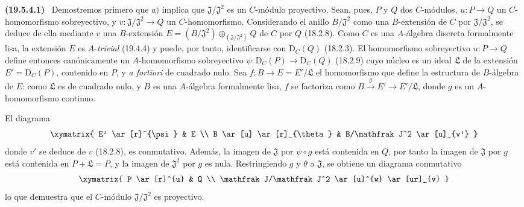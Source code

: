 \documentclass[10pt,oneside]{book}
\makeatletter
\newcommand{\setmanualcurrentlabel}[1]{\def\@currentlabel{#1}}
\newcommand{\oldpage}[2][]{%
  \setcounter{footnote}{0}%
  \marginpar{\scriptsize\textbf{#1}~|~#2}\ignorespaces}
\newenvironment{env}[1][]{\setmanualcurrentlabel{#1}\par\medskip\noindent\textbf{(#1)}\ }{\par}
\makeatother
\begin{document}
\begin{env}[19.5.4.1]
\label{0.19.5.4.1-es}
Demostremos primero que $a)$ implica que $\mathfrak J/\mathfrak J^2$ es un
$C$-módulo proyectivo. Sean, pues, $P$ y $Q$ dos $C$-módulos,
$u:P\to Q$ un $C$-homomorfismo sobreyectivo, y
$v:\mathfrak J/\mathfrak J^2\to Q$ un $C$-homomorfismo. Considerando el anillo
$B/\mathfrak J^2$ como una $B$-extensión de $C$ por
$\mathfrak J/\mathfrak J^2$, se deduce de ella mediante $v$ una $B$-extensión
$E=(B/\mathfrak J^2)\oplus_{(\mathfrak J/\mathfrak J^2)}Q$ de $C$ por $Q$
(18.2.8). Como $C$ es una $A$-álgebra discreta formalmente lisa,
la extensión $E$ es $A$-\emph{trivial} (19.4.4) y puede, por tanto, identificarse con
$\mathrm D_C(Q)$ (18.2.3). El homomorfismo sobreyectivo $u:P\to Q$ define entonces
canónicamente un $A$-homomorfismo sobreyectivo
$\psi:\mathrm D_C(P)\to\mathrm D_C(Q)$ (18.2.9) cuyo núcleo es un ideal
$\mathfrak L$ de la extensión $E'=\mathrm D_C(P)$, contenido en $P$, y
\emph{a fortiori} de cuadrado nulo. Sea $f:B\to E=E'/\mathfrak L$
el homomorfismo que define la estructura de $B$-álgebra de $E$: como
$\mathfrak L$ es de cuadrado nulo, y $B$ es una $A$-álgebra formalmente
lisa, $f$ se factoriza como $B\xrightarrow{g}E'\to E'/\mathfrak L$, donde $g$ es
un $A$-homomorfismo continuo.

\oldpage[0\textsubscript{IV-1}]{92}

El diagrama
\[
  \xymatrix{
    E' \ar[r]^{\psi} & E \\
    B \ar[u] \ar[r]_{\theta} & B/\mathfrak J^2 \ar[u]_{v'}
  }
\]
donde $v'$ se deduce de $v$ (18.2.8), es conmutativo. Además, la imagen de
$\mathfrak J$ por $\psi\circ g$ está contenida en $Q$, por tanto la imagen de
$\mathfrak J$ por $g$ está contenida en $P+\mathfrak L=P$, y la imagen de
$\mathfrak J^2$ por $g$ es nula. Restringiendo $g$ y $\theta$ a
$\mathfrak J$, se obtiene un diagrama conmutativo
\[
  \xymatrix{
    P \ar[r]^{u} & Q \\
    \mathfrak J/\mathfrak J^2 \ar[u]^{w} \ar[ur]_{v}
  }
\]
lo que demuestra que el $C$-módulo $\mathfrak J/\mathfrak J^2$ es proyectivo.
\end{env}
\end{document}
